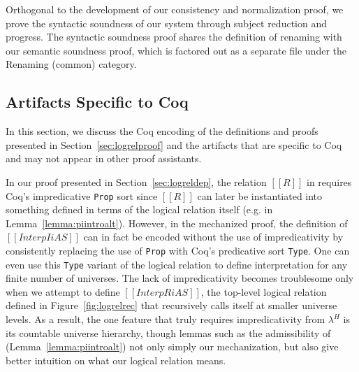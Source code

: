 \documentclass[acmsmall,screen=true,
\ifpublic review=false\else,review=true\fi
  ,anonymous=\ifanonymous true\else false\fi]{acmart}
\newcommand{\lang}{$\lambda^H$\xspace}
\newcommand{\scw}[1]{}
\begin{document}
Orthogonal to the development of our consistency and normalization
proof, we prove the syntactic soundness of our system through subject
reduction and progress. The syntactic soundness proof shares the
definition of renaming with our semantic soundness proof, which is
factored out as a separate file under the Renaming (common) category.

\subsection{Artifacts Specific to Coq}
In this section, we discuss the Coq encoding of the definitions and proofs presented
in Section~\ref{sec:logrelproof}  and the artifacts that are
specific to Coq and may not appear in other proof assistants.


In our proof presented in Section~\ref{sec:logreldep}, the relation
$[[R]]$ in  requires Coq's impredicative \texttt{Prop} sort
since $[[R]]$ can later be instantiated into something defined in
terms of the logical relation itself (e.g. in
Lemma~\ref{lemma:piintroalt}). However, in the mechanized proof, the
definition of $[[Interp I i A S]]$ can in fact be encoded without the
use of impredicativity by consistently replacing the use of
\texttt{Prop} with Coq's predicative sort \texttt{Type}. One can even
use this \texttt{Type} variant of the logical relation to define
interpretation for any finite number of universes. The lack of
impredicativity becomes troublesome only when we attempt to define
$[[InterpR i A S]]$, the top-level logical relation defined in
Figure~\ref{fig:logrelrec} that recursively calls itself at smaller
universe levels. As a result, the one feature that truly requires
impredicativity from \lang{} is its countable universe
hierarchy, though lemmas such as the admissibility of 
(Lemma~\ref{lemma:piintroalt}) not only simply our mechanization, but
also give better intuition on what our logical relation means.
\end{document}
